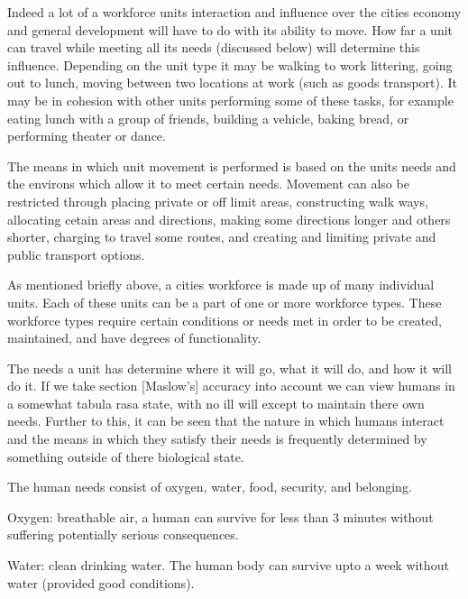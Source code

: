 Indeed a lot of a workforce units interaction and influence over the cities economy and general development will have to do with its ability to move. How far a unit can travel while meeting all its needs (discussed below) will determine this influence. Depending on the unit type it may be walking to work littering, going out to lunch, moving between two locations at work (such as goods transport). It may be in cohesion with other units performing some of these tasks, for example eating lunch with a group of friends, building a vehicle, baking bread, or performing theater or dance. 

The means in which unit movement is performed is based on the units needs and the environs which allow it to meet certain needs. Movement can also be restricted through placing private or off limit areas, constructing walk ways, allocating cetain areas and directions, making some directions longer and others shorter, charging to travel some routes, and creating and limiting private and public transport options. 








As mentioned briefly above, a cities workforce is made up of many individual units. Each of these units can be a part of one or more workforce types. These workforce types require certain conditions or needs met in order to be created, maintained, and have degrees of functionality. 

The needs a unit has determine where it will go, what it will do, and how it will do it. If we take section [Maslow's] accuracy into account we can view humans in a somewhat tabula rasa state, with no ill will except to maintain there own needs. Further to this, it can be seen that the nature in which humans interact and the means in which they satisfy their needs is frequently determined by something outside of there biological state. 

The human needs consist of oxygen, water, food, security, and belonging.



Oxygen: breathable air, a human can survive for less than 3 minutes without suffering potentially serious consequences. 

Water: clean drinking water. The human body can survive upto a week without water (provided good conditions). 

